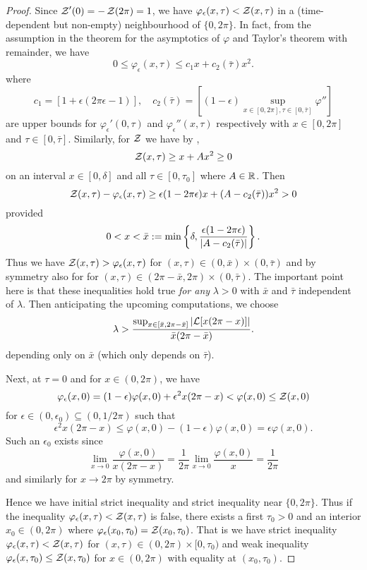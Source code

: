 \documentclass[a4paper, 12pt]{amsart}
\begin{document}
\begin{proof}
Since \(\operatorname{\mathcal{Z}}'(0) = -\operatorname{\mathcal{Z}}(2\pi) = 1\), we have \(\varphi_{\epsilon} (x, \tau) < \operatorname{\mathcal{Z}}(x, \tau)\) in a (time-dependent but non-empty) neighbourhood of \(\{0, 2\pi\}\). In fact, from the assumption in the theorem for the asymptotics of \(\varphi\) and Taylor's theorem with remainder, we have
\[
0 \leq \varphi_{\epsilon}(x, \tau) \leq c_1 x + c_2(\bar{\tau}) x^2.
\]
where
\[
c_1 = \left[1 + \epsilon(2\pi \epsilon - 1)\right], \quad c_2(\bar{\tau}) = \left[(1-\epsilon) \sup_{x\in [0, 2\pi], \tau \in [0, \bar{\tau}]} \varphi''\right]
\]
are upper bounds for \(\varphi_{\epsilon}'(0, \tau)\) and \(\varphi_{\epsilon}''(x, \tau)\) respectively with \(x \in [0, 2\pi]\) and \(\tau \in [0, \bar{\tau}]\). Similarly, for \(\operatorname{\mathcal{Z}}\) we have by ,
\[
\operatorname{\mathcal{Z}}(x, \tau) \geq x + A x^2 \geq 0
\]
on an interval \(x \in [0, \delta]\) and all \(\tau \in [0, \tau_0]\) where \(A \in \mathbb{R}\). Then
\[
\operatorname{\mathcal{Z}}(x, \tau) - \varphi_{\epsilon}(x, \tau) \geq \epsilon(1-2\pi \epsilon) x + (A - c_2(\bar{\tau})) x^2 > 0
\]
provided
\[
0 < x < \bar{x} := \min\left\{\delta, \frac{\epsilon(1-2\pi \epsilon)}{\left\lvert{A - c_2(\bar{\tau})}\right\rvert}\right\}.
\]
Thus we have \(\operatorname{\mathcal{Z}}(x, \tau) > \varphi_{\epsilon}(x, \tau)\) for \((x, \tau) \in (0, \bar{x}) \times (0, \bar{\tau})\) and by symmetry also for for \((x, \tau) \in (2\pi-\bar{x}, 2\pi) \times (0, \bar{\tau})\). The important point here is that these inequalities hold true \emph{for any} \(\lambda > 0\) with \(\bar{x}\) and \(\bar{\tau}\) independent of \(\lambda\). Then anticipating the upcoming computations, we choose
\[
\lambda > \frac{\sup_{x \in [\bar{x}, 2\pi-\bar{x}]} \left\lvert{\mathcal{L} [x(2\pi-x)]}\right\rvert}{\bar{x}(2\pi - \bar{x})}.
\]
depending only on \(\bar{x}\) (which only depends on \(\bar{\tau}\)).

Next, at \(\tau = 0\) and for \(x \in (0, 2\pi)\), we have
\[
\varphi_{\epsilon} (x, 0) = (1-\epsilon) \varphi(x, 0) + \epsilon^2 x(2\pi -x) < \varphi(x, 0) \leq \operatorname{\mathcal{Z}}(x, 0)
\]
for \(\epsilon \in (0, \epsilon_0) \subseteq (0, 1/2\pi)\) such that
\[
\epsilon^2 x(2\pi -x) \leq \varphi(x, 0) - (1-\epsilon) \varphi(x, 0) = \epsilon \varphi(x, 0).
\]
Such an \(\epsilon_0\) exists since
\[
\lim_{x \to 0} \frac{\varphi(x, 0)}{x (2\pi -x)} = \frac{1}{2\pi} \lim_{x \to 0} \frac{\varphi(x, 0)}{x} = \frac{1}{2\pi}
\]
and similarly for \(x \to 2\pi\) by symmetry.

Hence we have initial strict inequality and strict inequality near \(\{0, 2\pi\}\). Thus if the inequality \(\varphi_{\epsilon}(x, \tau) < \operatorname{\mathcal{Z}}(x, \tau)\) is false, there exists a first \(\tau_0 > 0\) and an interior \(x_0 \in (0, 2\pi)\) where \(\varphi_{\epsilon}(x_0, \tau_0) = \operatorname{\mathcal{Z}}(x_0, \tau_0)\). That is we have strict inequality \(\varphi_{\epsilon}(x, \tau) < \operatorname{\mathcal{Z}}(x, \tau)\) for \((x, \tau) \in (0, 2\pi) \times [0, \tau_0)\) and weak inequality \(\varphi_{\epsilon}(x, \tau_0) \leq \operatorname{\mathcal{Z}}(x, \tau_0)\) for \(x \in (0, 2\pi)\) with equality at \((x_0, \tau_0)\).


\end{proof}
\end{document}
